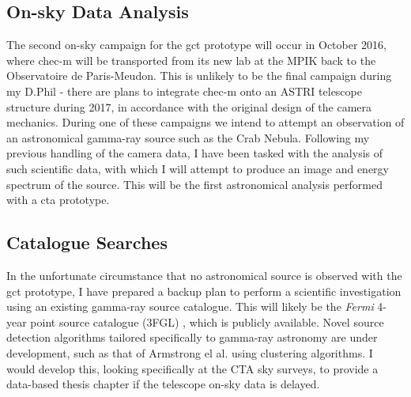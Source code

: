 \documentclass[%
amsmath,amssymb,
onecolumn,
a4paper,
10pt
]{article}%
\begin{document}
	\subsection{On-sky Data Analysis}
	The second on-sky campaign for the \gls{gct} prototype will occur in October 2016, where \gls{chec-m} will be transported from its new lab at the MPIK back to the Observatoire de Paris-Meudon. This is unlikely to be the final campaign during my D.Phil - there are plans to integrate \gls{chec-m} onto an ASTRI telescope structure during 2017, in accordance with the original design of the camera mechanics. During one of these campaigns we intend to attempt an observation of an astronomical gamma-ray source such as the Crab Nebula. Following my previous handling of the camera data, I have been tasked with the analysis of such scientific data, with which I will attempt to produce an image and energy spectrum of the source. This will be the first astronomical analysis performed with a \gls{cta} prototype.
	
	\subsection{Catalogue Searches}
	In the unfortunate circumstance that no astronomical source is observed with the \gls{gct} prototype, I have prepared a backup plan to perform a scientific investigation using an existing gamma-ray source catalogue.  This will likely be the \textit{Fermi} 4-year point source catalogue (3FGL) \cite{Acero2015}, which is publicly available. Novel source detection algorithms tailored specifically to gamma-ray astronomy are under development, such as that of Armstrong el al.\cite{Armstrong2015a} using clustering algorithms. I would develop this, looking specifically at the CTA sky surveys, to provide a data-based thesis chapter if the telescope on-sky data is delayed.
	
	
	
	\newpage
	\printglossary[nonumberlist,type=\acronymtype,title=Abbreviations]
\end{document}
